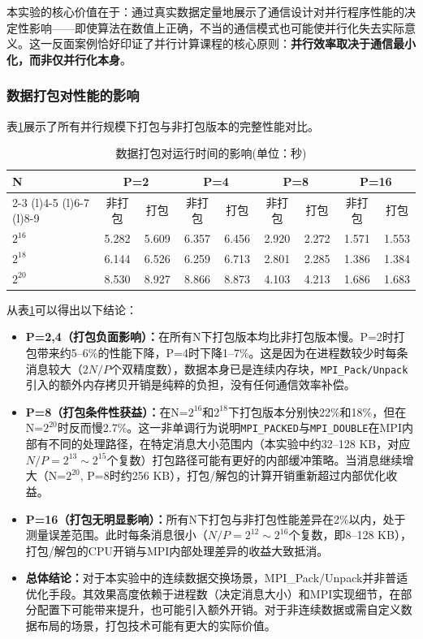 \documentclass{SYSUReport}
\begin{document}
本实验的核心价值在于：通过真实数据定量地展示了通信设计对并行程序性能的决定性影响——即使算法在数值上正确，不当的通信模式也可能使并行化失去实际意义。这一反面案例恰好印证了并行计算课程的核心原则：\textbf{并行效率取决于通信最小化，而非仅并行化本身}。

\subsubsection{数据打包对性能的影响}

表\ref{tab:pack_comparison}展示了所有并行规模下打包与非打包版本的完整性能对比。

\begin{table}[h!]
\centering
\caption{数据打包对运行时间的影响(单位：秒)}
\label{tab:pack_comparison}
\begin{tabular}{@{}lcccccccc@{}}
\toprule
\multirow{2}{*}{N} & \multicolumn{2}{c}{P=2} & \multicolumn{2}{c}{P=4} & \multicolumn{2}{c}{P=8} & \multicolumn{2}{c}{P=16} \\
\cmidrule(l){2-3} \cmidrule(l){4-5} \cmidrule(l){6-7} \cmidrule(l){8-9}
                   & 非打包 & 打包   & 非打包 & 打包   & 非打包 & 打包   & 非打包 & 打包 \\ \midrule
$2^{16}$           & 5.282 & 5.609 & 6.357 & 6.456 & 2.920 & 2.272 & 1.571 & 1.553 \\
$2^{18}$           & 6.144 & 6.526 & 6.259 & 6.713 & 2.801 & 2.285 & 1.386 & 1.384 \\
$2^{20}$           & 8.530 & 8.927 & 8.866 & 8.873 & 4.103 & 4.213 & 1.686 & 1.683 \\
\bottomrule
\end{tabular}
\end{table}

从表\ref{tab:pack_comparison}可以得出以下结论：

\begin{itemize}
    \item \textbf{P=2,4（打包负面影响）：}在所有N下打包版本均比非打包版本慢。P=2时打包带来约5--6\%的性能下降，P=4时下降1--7\%。这是因为在进程数较少时每条消息较大（$2N/P$个双精度数），数据本身已是连续内存块，\texttt{MPI\_Pack/Unpack}引入的额外内存拷贝开销是纯粹的负担，没有任何通信效率补偿。
    \item \textbf{P=8（打包条件性获益）：}在N=$2^{16}$和$2^{18}$下打包版本分别快22\%和18\%，但在N=$2^{20}$时反而慢2.7\%。这一非单调行为说明\texttt{MPI\_PACKED}与\texttt{MPI\_DOUBLE}在MPI内部有不同的处理路径，在特定消息大小范围内（本实验中约32--128 KB，对应$N/P=2^{13}\sim 2^{15}$个复数）打包路径可能有更好的内部缓冲策略。当消息继续增大（N=$2^{20}$, P=8时约256 KB），打包/解包的计算开销重新超过内部优化收益。
    \item \textbf{P=16（打包无明显影响）：}所有N下打包与非打包性能差异在2\%以内，处于测量误差范围。此时每条消息很小（$N/P=2^{12}\sim 2^{16}$个复数，即8--128 KB），打包/解包的CPU开销与MPI内部处理差异的收益大致抵消。
    \item \textbf{总体结论：}对于本实验中的连续数据交换场景，MPI\_Pack/Unpack并非普适优化手段。其效果高度依赖于进程数（决定消息大小）和MPI实现细节，在部分配置下可能带来提升，也可能引入额外开销。对于非连续数据或需自定义数据布局的场景，打包技术可能有更大的实际价值。
\end{itemize}
\end{document}

